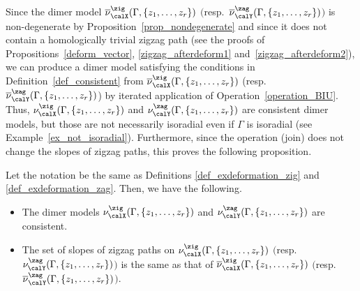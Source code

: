 Since the dimer model $\overline{\nu}^\zig_\calX(\Gamma, \{z_1,\dots,z_r\})$ $($resp.\ $\overline{\nu}^\zag_\calY(\Gamma, \{z_1,\dots,z_r\})$$)$ is non-degenerate by Proposition~\ref{prop_nondegenerate}
and since it does not contain a homologically trivial zigzag path (see the proofs of Propositions~\ref{deform_vector}, \ref{zigzag_afterdeform1} and~\ref{zigzag_afterdeform2}),
we can produce a dimer model satisfying the conditions in Definition~\ref{def_consistent}
from $\overline{\nu}^\zig_\calX(\Gamma, \{z_1,\dots,z_r\})$ (resp.\ $\overline{\nu}^\zag_\calY(\Gamma, \{z_1,\dots,z_r\})$)
by iterated application of Operation~\ref{operation_BIU}.
Thus, $\nu^\zig_\calX(\Gamma, \{z_1,\dots,z_r\})$ and $\nu^\zag_\calY(\Gamma, \{z_1,\dots,z_r\})$ are consistent dimer models, but those are not necessarily isoradial even if $\Gamma$ is isoradial (see Example~\ref{ex_not_isoradial}).
Furthermore, since the operation (join) does not change the slopes of zigzag paths, this proves the following proposition.

\begin{Proposition}\label{prop_make_consistent}
Let the notation be the same as Definitions {\rm \ref{def_exdeformation_zig}} and {\rm \ref{def_exdeformation_zag}}.
Then, we have the following.
\begin{itemize}\itemsep=0pt
\item[\rm (1)] The dimer models $\nu^\zig_\calX(\Gamma, \{z_1,\dots,z_r\})$ and $\nu^\zag_\calY(\Gamma, \{z_1,\dots,z_r\})$ are consistent.
\item[\rm (2)] The set of slopes of zigzag paths on $\nu^\zig_\calX(\Gamma, \{z_1,\dots,z_r\})$ $($resp.\ $\nu^\zag_\calY(\Gamma, \{z_1,\dots,z_r\})$$)$
is the same as that of $\overline{\nu}^\zig_\calX(\Gamma, \{z_1,\dots,z_r\})$ $($resp.\ $\overline{\nu}^\zag_\calY(\Gamma, \{z_1,\dots,z_r\})$$)$.
\end{itemize}
\end{Proposition}
